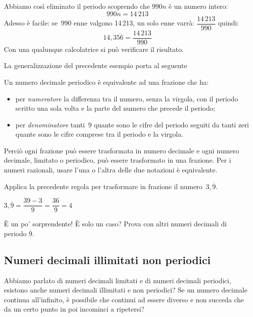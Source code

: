 Abbiamo così eliminato il periodo scoprendo che \(990n\) è un numero 
intero:
\[990n = 14\,213\]
Adesso è facile: se~990 enne valgono 14\,213, un solo enne varrà:
\(\dfrac{14\,213}{990}\)
quindi:
\[14,3\overline{56} = \frac{14\,213}{990}\]
Con una qualunque calcolatrice si può verificare il risultato.

\medskip
La generalizzazione del precedente esempio porta al 
seguente

\begin{teorema}{}{}
 Un numero decimale periodico è equivalente ad 
una frazione che ha:
\begin{itemize}
\item per \emph{numeratore} la differenza tra il numero, senza la virgola, 
con il periodo scritto una sola volta e la parte del numero che precede 
il periodo;
\item per \emph{denominatore} tanti~9 quante sono le cifre del periodo 
seguiti da tanti zeri quante sono le cifre comprese tra il periodo e la 
virgola.
\end{itemize}
\end{teorema}

Perciò ogni frazione può essere trasformata in 
numero decimale e ogni numero decimale, limitato o periodico, può essere 
trasformato in una frazione. 
Per i numeri razionali, usare l'una o l'altra delle due 
notazioni è equivalente.

\begin{osservazione}{}{}
Applica la precedente regola per trasformare in frazione il 
numero~\(3,\overline{9}\). 

\(3,\overline{9} = \dfrac{39 - 3}{9} = \dfrac{36}{9} = 4\)
\end{osservazione}

\noindent È un po' sorprendente! È solo un caso?
Prova con altri numeri decimali di periodo \(\overline{9}\).

\subsection{Numeri decimali illimitati non periodici}

Abbiamo parlato di numeri decimali limitati e di numeri decimali 
periodici, esistono anche numeri decimali illimitati e non periodici?
Se un numero decimale continua all'infinito, è possibile che continui ad 
essere diverso e non succeda che da un certo punto in poi incominci a 
ripetersi?

